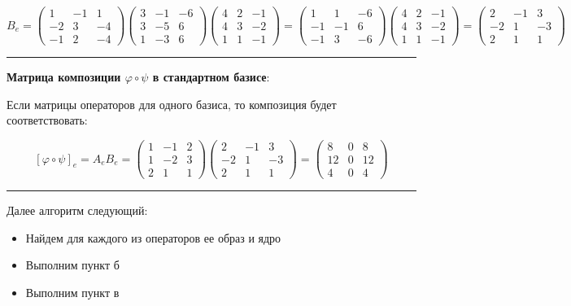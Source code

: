 \documentclass[11pt]{article}
\begin{document}
$$
B_e =
\begin{pmatrix}
1 & -1 & 1 \\
-2 & 3 & -4 \\
-1 & 2 & -4
\end{pmatrix}
\begin{pmatrix}
3 & -1 & -6 \\
3 & -5 & 6 \\
1 & -3 & 6
\end{pmatrix}
\begin{pmatrix}
4 & 2 & -1 \\
4 & 3 & -2 \\
1 & 1 & -1
\end{pmatrix} =
\begin{pmatrix}
1 & 1 & -6 \\
-1 & -1 & 6 \\
-1 & 3 & -6
\end{pmatrix}
\begin{pmatrix}
4 & 2 & -1 \\
4 & 3 & -2 \\
1 & 1 & -1
\end{pmatrix} =
\begin{pmatrix}
2 & -1 & 3 \\
-2 & 1 & -3 \\
2 & 1 & 1
\end{pmatrix}
$$

\noindent\rule{\textwidth}{0.5pt}
\textbf{Матрица композиции $\varphi\circ\psi$ в стандартном базисе}:

Если матрицы операторов для одного базиса, то композиция будет соответствовать:

$$
[\varphi\circ\psi]_e
= A_eB_e = \begin{pmatrix}
1 & -1 & 2 \\
1 & -2 & 3 \\
2 & 1 & 1
\end{pmatrix}
\begin{pmatrix}
2 & -1 & 3 \\
-2 & 1 & -3 \\
2 & 1 & 1
\end{pmatrix} =
\begin{pmatrix}
8 & 0 & 8 \\
12 & 0 & 12 \\
4 & 0 & 4
\end{pmatrix}
$$

\noindent\rule{\textwidth}{0.5pt}
Далее алгоритм следующий:

\begin{itemize}
  \item Найдем для каждого из операторов ее образ и ядро
  \item Выполним пункт б
  \item Выполним пункт в
\end{itemize}
\end{document}
